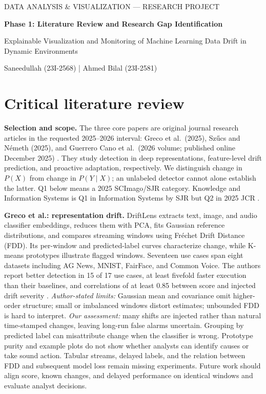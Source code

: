 \documentclass[10pt,a4paper]{article}
\begin{document}
\begin{center}
{\small DATA ANALYSIS \& VISUALIZATION --- RESEARCH PROJECT}\par
{\Large\bfseries Phase 1: Literature Review and Research Gap Identification}\par
Explainable Visualization and Monitoring of Machine Learning Data Drift in Dynamic Environments\par
{\small Saneedullah (23I-2568) \quad | \quad Ahmed Bilal (23I-2581)}
\end{center}
\vspace{-5pt}
\section*{Critical literature review}
\textbf{Selection and scope.} The three core papers are original journal research articles in the requested 2025--2026 interval: Greco et al.\ (2025), Sz\H{u}cs and N\'emeth (2025), and Guerrero Cano et al.\ (2026 volume; published online December 2025) \cite{greco,szucs,guerrero}. They study detection in deep representations, feature-level drift prediction, and proactive adaptation, respectively. We distinguish change in $P(X)$ from change in $P(Y\mid X)$; an unlabeled detector cannot alone establish the latter. Q1 below means a 2025 SCImago/SJR category. Knowledge and Information Systems is Q1 in Information Systems by SJR but Q2 in 2025 JCR \cite{ranking}.

\textbf{Greco et al.: representation drift.} DriftLens extracts text, image, and audio classifier embeddings, reduces them with PCA, fits Gaussian reference distributions, and compares streaming windows using Fr\'echet Drift Distance (FDD). Its per-window and predicted-label curves characterize change, while K-means prototypes illustrate flagged windows. Seventeen use cases span eight datasets including AG News, MNIST, FairFace, and Common Voice. The authors report better detection in 15 of 17 use cases, at least fivefold faster execution than their baselines, and correlations of at least 0.85 between score and injected drift severity \cite{greco}. \emph{Author-stated limits:} Gaussian mean and covariance omit higher-order structure; small or imbalanced windows distort estimates; unbounded FDD is hard to interpret. \emph{Our assessment:} many shifts are injected rather than natural time-stamped changes, leaving long-run false alarms uncertain. Grouping by predicted label can misattribute change when the classifier is wrong. Prototype purity and example plots do not show whether analysts can identify causes or take sound action. Tabular streams, delayed labels, and the relation between FDD and subsequent model loss remain missing experiments. Future work should align score, known changes, and delayed performance on identical windows and evaluate analyst decisions.
\end{document}
